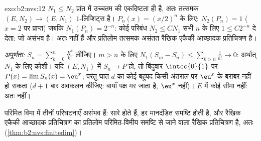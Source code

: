 \begin{solution}{exo:b2:nvs:12}
$N_1 \leq N_2$ प्रांत में उच्चतम की एकदिष्टता ही है, अतः तत्समक $(E, N_2) \to (E, N_1)$ $1$-लिप्शिट्स
है। $P_n(x) =
(x/2)^n$ के लिए: $N_2(P_n) = 1$ ($x = 2$ पर प्राप्त) जबकि $N_1(P_n) =
2^{-n}$: कोई परिबंध $N_2 \leq CN_1$ सभी $n$
के लिए $1 \leq C2^{-n}$ दे देता: जो असंभव है। अतः   नहीं हैं और प्रतिलोम
तत्समक असंतत रैखिक एकैकी आच्छादक प्रतिचित्रण है।

\emph{अपूर्णता:} $S_n = \sum_{k=0}^{n}\frac{X^k}{k!}$ लीजिए। $m > n$ के लिए $N_1(S_m - S_n) \leq \sum_{k>n}\frac1{k!} \to 0$: अर्थात् $N_1$ के लिए कोशी।
यदि $(E, N_1)$ में $S_n \to P$ हो, तो बिंदुवार $\intcc{0}{1}$ पर $P(x) = \lim S_n(x) = \eu^x$; परंतु घात $d$ का कोई बहुपद
किसी अंतराल पर $\eu^x$ के बराबर नहीं हो सकता ($d + 1$ बार अवकलन कीजिए: बायाँ
पक्ष मर जाता है, $\eu^x$ नहीं)। $E$ में कोई सीमा नहीं: अतः  नहीं।

परिमित विमा में तीनों परिघटनाएँ असंभव हैं: सारे   होते हैं,
हर मानदंडित समष्टि  होती है, और रैखिक एकैकी आच्छादक प्रतिचित्रण का
प्रतिलोम परिमित-विमीय समष्टि से जाने वाला रैखिक प्रतिचित्रण है, अतः 
(\cref{thm:b2:nvs:finitedim})।
\end{solution}

